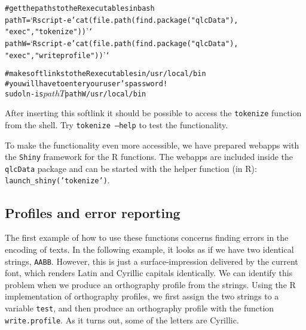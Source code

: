 \documentclass[output=book,nonflat,modfonts,
colorlinks, citecolor=brown,
		]{langsci/langscibook}\usepackage[]{graphicx}\usepackage[]{color}
\makeatletter
\newenvironment{kframe}{%
 \def\at@end@of@kframe{}%
 \ifinner\ifhmode%
  \def\at@end@of@kframe{\end{minipage}}%
  \begin{minipage}{\columnwidth}%
 \fi\fi%
 \def\FrameCommand##1{\hskip\@totalleftmargin \hskip-\fboxsep
 \colorbox{shadecolor}{##1}\hskip-\fboxsep
     \hskip-\linewidth \hskip-\@totalleftmargin \hskip\columnwidth}%
 \MakeFramed {\advance\hsize-\width
   \@totalleftmargin\z@ \linewidth\hsize
   \@setminipage}}%
 {\par\unskip\endMakeFramed%
 \at@end@of@kframe}
\newenvironment{knitrout}{}{} %
\makeatother
\begin{document}
\begin{knitrout}\scriptsize
{}\color{fgcolor}\begin{kframe}
\begin{alltt}
# get the paths to the R executables in bash
pathT=`Rscript -e 'cat(file.path(find.package("qlcData"), 
  "exec", "tokenize"))'`
pathW=`Rscript -e 'cat(file.path(find.package("qlcData"), 
  "exec", "writeprofile"))'`

# make softlinks to the R executables in /usr/local/bin
# you will have to enter your user's password!
sudo ln -is $pathT $pathW /usr/local/bin
\end{alltt}
\end{kframe}
\end{knitrout}

After inserting this softlink it should be possible to access the
\texttt{tokenize} function from the shell. Try \texttt{tokenize --help} to test
the functionality.



To make the functionality even more accessible, we have prepared webapps with 
the \texttt{Shiny} framework for the R functions. The webapps are 
included inside the \texttt{qlcData} package and can be started with the 
helper function (in R): \texttt{launch\_shiny('tokenize')}.




\subsection*{Profiles and error reporting}
\label{error-reporting}

The first example of how to use these functions concerns finding errors in the
encoding of texts. In the following example, it looks as if we have two
identical strings, \texttt{AABB}. However, this is just a surface-impression
delivered by the current font, which renders Latin and Cyrillic capitals
identically. We can identify this problem when we produce an orthography profile
from the strings. Using the R implementation of orthography profiles, we
first assign the two strings to a variable \texttt{test}, and then produce an
orthography profile with the function \texttt{write.profile}. As it turns out,
some of the letters are Cyrillic.
\end{document}

